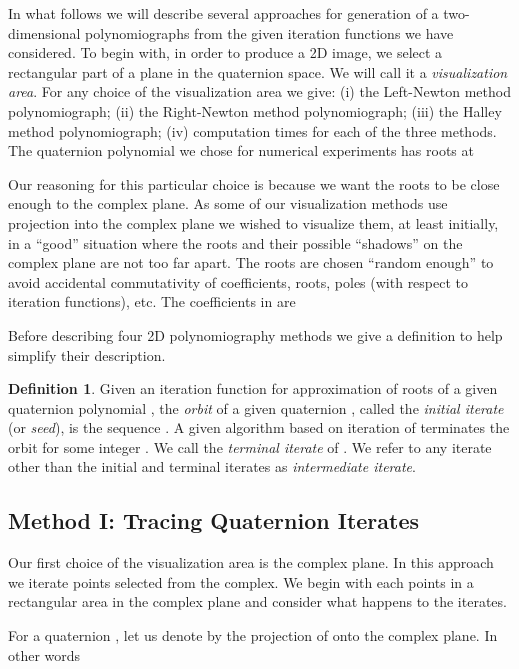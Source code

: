 \documentclass{article}
\theoremstyle{definition}
\newtheorem{definition}{Definition}
\begin{document}
In what follows we will describe several approaches for generation of a two-dimensional polynomiographs from the  given iteration functions we have considered. To begin with, in order to produce a 2D image, we select a rectangular part of a plane in the quaternion space. We will call it a {\it visualization area}.
For any choice of the visualization area we give: (i) the Left-Newton method polynomiograph; (ii) the Right-Newton method polynomiograph; (iii) the Halley method polynomiograph; (iv) computation times for each of the three methods.  The quaternion polynomial we chose for numerical experiments has roots at

Our reasoning for this particular choice is because we want the roots to be close enough to the complex plane. As some of our visualization methods use projection into the complex plane we wished to visualize them, at least initially, in a ``good'' situation where the roots and their possible ``shadows'' on the complex plane are not too far apart.  The roots are chosen ``random enough'' to avoid accidental commutativity of coefficients, roots, poles (with respect to iteration functions), etc. The coefficients  in  are


Before describing four 2D polynomiography methods we give a definition to help simplify their description.

\begin{definition} Given an iteration function  for approximation of roots of a given quaternion polynomial , the {\it orbit} of a given quaternion , called the {\it initial iterate} (or {\it seed}), is the sequence . A given algorithm based on iteration of  terminates the orbit for some integer .  We call  the {\it terminal iterate} of . We refer to any iterate other than the initial and terminal iterates as {\it intermediate iterate}.
\end{definition}

\subsection{Method I:  Tracing Quaternion Iterates}
\label{CPVisualization}

Our first choice of the visualization area is the complex plane.  In this approach we iterate points selected from the complex.  We begin with each points in a rectangular area in the complex plane and consider what happens to the iterates.

For a quaternion , let us denote by  the projection of  onto the complex plane. In other words
\end{document}
